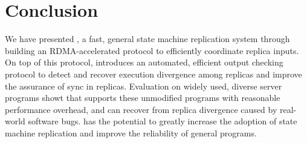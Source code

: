\section{Conclusion}\label{sec:conclusion}

We have presented \xxx, a fast, general state machine replication system 
through building an RDMA-accelerated \paxos protocol to efficiently coordinate 
replica inputs. On top of this protocol, \xxx introduces an automated, 
efficient output checking protocol to detect and recover execution divergence 
among replicas and improve the assurance of sync in replicas. Evaluation on 
widely used, diverse server programs showt that \xxx supports these unmodified 
programs with reasonable performance overhead, and can recover from replica 
divergence caused by real-world software bugs. \xxx has the potential to 
greatly increase the adoption of state machine replication and improve the 
reliability of general programs.
